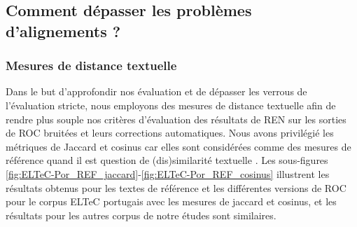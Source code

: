 \subsection{Comment dépasser les problèmes d'alignements ? }
\label{subsec:ditances_creux_COR-OCR-IMPACT-NER}
\subsubsection{Mesures de distance textuelle}

Dans le but d'approfondir nos évaluation et de dépasser les verrous de l'évaluation stricte, nous employons des mesures de distance textuelle afin de rendre plus souple nos critères d'évaluation des résultats de REN sur les sorties de ROC bruitées et leurs corrections automatiques. Nous avons privilégié les métriques de Jaccard et cosinus car elles sont considérées comme des mesures de référence quand il est question de (dis)similarité textuelle \cite{buscaldi2020calcul}. Les sous-figures \ref{fig:ELTeC-Por_REF_jaccard}-\ref{fig:ELTeC-Por_REF_cosinus} illustrent les résultats obtenus pour les textes de référence et les différentes versions de ROC pour le corpus ELTeC portugais avec les mesures de jaccard et cosinus, et les résultats pour les autres corpus de notre études sont similaires.

